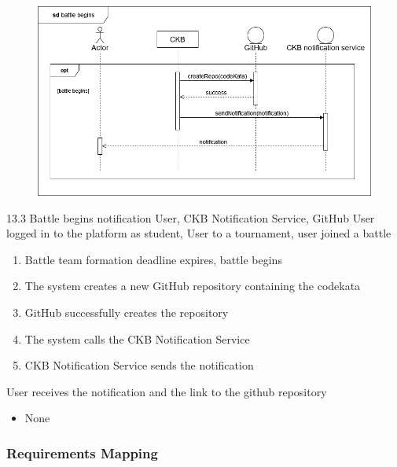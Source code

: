 \usecase
{
    \begin{figure}[H]
        \centering
        \includegraphics[width=\textwidth]{src/sequence_diagrams/battlebegins.png}
    \end{figure}
}
{13.3}
{Battle begins notification} %
{User, CKB Notification Service, GitHub} %
{User logged in to the platform as student, User to a tournament, user joined a battle} %
{ %
    \begin{enumerate}
        \item Battle team formation deadline expires, battle begins
        \item The system creates a new GitHub repository containing the codekata
        \item GitHub successfully creates the repository 
        \item The system calls the CKB Notification Service 
        \item CKB Notification Service sends the notification
    \end{enumerate}
}
{User receives the notification and the link to the github repository} %
{ %
    \begin{itemize}
        \item None
    \end{itemize}
}
{ %

}




\newpage

\subsubsection{Requirements Mapping}

\vspace{1cm}

